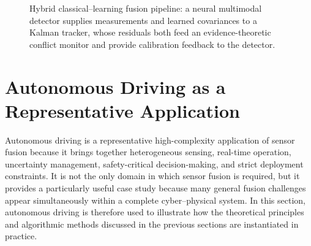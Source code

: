 \documentclass[11pt,oneside,openany]{book}
\begin{document}
{\begin{figure}[!t]
    \centering
    \caption{\color{blue}Hybrid classical--learning fusion pipeline: a neural multimodal detector supplies measurements and learned covariances to a Kalman tracker, whose residuals both feed an evidence-theoretic conflict monitor and provide calibration feedback to the detector.}
    \label{fig:hybrid-pipeline}
\end{figure}
}

\chapter{Autonomous Driving as a Representative Application}
\label{sec:application}

Autonomous driving is a representative high-complexity application of sensor fusion because it brings together heterogeneous sensing, real-time operation, uncertainty management, safety-critical decision-making, and strict deployment constraints. It is not the only domain in which sensor fusion is required, but it provides a particularly useful case study because many general fusion challenges appear simultaneously within a complete cyber--physical system. In this section, autonomous driving is therefore used to illustrate how the theoretical principles and algorithmic methods discussed in the previous sections are instantiated in practice.
\end{document}
